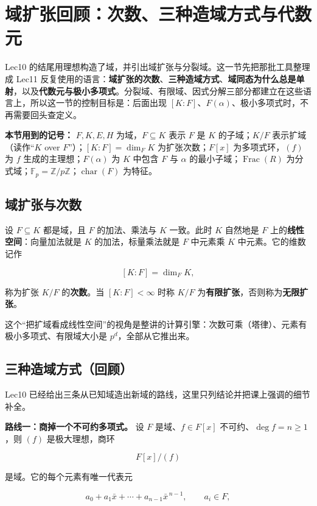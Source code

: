 \section{域扩张回顾：次数、三种造域方式与代数元}


Lec10 的结尾用理想构造了域，并引出域扩张与分裂域。这一节先把那批工具整理成 Lec11 反复使用的语言：\textbf{域扩张的次数}、\textbf{三种造域方式}、\textbf{域同态为什么总是单射}，以及\textbf{代数元与极小多项式}。分裂域、有限域、因式分解三部分都建立在这些语言上，所以这一节的控制目标是：后面出现 $[K:F]$、$F(\alpha)$、极小多项式时，不再需要回头查定义。

\textbf{本节用到的记号：} $F,K,E,H$ 为域，$F\subseteq K$ 表示 $F$ 是 $K$ 的子域；$K/F$ 表示扩域（读作“$K$ over $F$”）；$[K:F]=\dim_F K$ 为扩张次数；$F[x]$ 为多项式环，$(f)$ 为 $f$ 生成的主理想；$F(\alpha)$ 为 $K$ 中包含 $F$ 与 $\alpha$ 的最小子域；$\operatorname{Frac}(R)$ 为分式域；$\mathbb F_p=\mathbb Z/p\mathbb Z$；$\operatorname{char}(F)$ 为特征。

\subsection{域扩张与次数}


设 $F\subseteq K$ 都是域，且 $F$ 的加法、乘法与 $K$ 一致。此时 $K$ 自然地是 $F$ 上的\textbf{线性空间}：向量加法就是 $K$ 的加法，标量乘法就是 $F$ 中元素乘 $K$ 中元素。它的维数记作

\[
[K:F]=\dim_F K,
\]

称为扩张 $K/F$ 的\textbf{次数}。当 $[K:F]<\infty$ 时称 $K/F$ 为\textbf{有限扩张}，否则称为\textbf{无限扩张}。

这个“把扩域看成线性空间”的视角是整讲的计算引擎：次数可乘（塔律）、元素有极小多项式、有限域大小是 $p^d$，全部从它推出来。

\subsection{三种造域方式（回顾）}


Lec10 已经给出三条从已知域造出新域的路线，这里只列结论并把课上强调的细节补全。

\textbf{路线一：商掉一个不可约多项式。} 设 $F$ 是域、$f\in F[x]$ 不可约、$\deg f=n\ge1$，则 $(f)$ 是极大理想，商环

\[
F[x]/(f)
\]

是域。它的每个元素有唯一代表元

\[
a_0+a_1\bar x+\cdots+a_{n-1}\bar x^{\,n-1},\qquad a_i\in F,
\]

